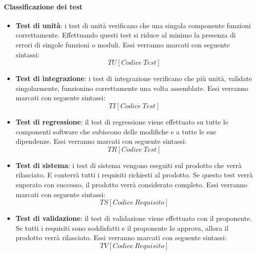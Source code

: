 \documentclass[../NormeDiProgetto_v4.0.0.tex]{subfiles}
\begin{document}
		\paragraph{Classificazione dei test}
			\begin{itemize}
			\item \textbf{Test di unità}:
			i test di unità verificano che una singola componente funzioni correttamente. Effettuando questi test si riduce al minimo la presenza di errori di singole funzioni o moduli. Essi verranno marcati con seguente sintassi:\\
			\begin{equation*}
				TU[Codice \ Test]
			\end{equation*}
			\item \textbf{Test di integrazione}:
			i test di integrazione verificano che più unità, validate singolarmente, funzionino correttamente una volta assemblate. Essi verranno marcati con seguente sintassi:\\
			\begin{equation*}
			TI[Codice \ Test]
			\end{equation*}
			\item \textbf{Test di regressione}:
			il test di regressione viene effettuato su tutte le componenti software che subiscono delle modifiche e a tutte le sue dipendenze.
			Essi verranno marcati con seguente sintassi:\\
			\begin{equation*}
			TR[Codice \ Test]
			\end{equation*}
			\item \textbf{Test di sistema}:
			i test di sistema vengono eseguiti sul prodotto che verrà rilasciato. E conterrà tutti i requisiti richiesti al prodotto. Se questo test verrà superato con successo, il prodotto verrà considerato completo.
			Essi verranno marcati con seguente sintassi:\\
			\begin{equation*}
			TS[Codice \ Requisito]
			\end{equation*}
			\item \textbf{Test di validazione}:
			il test di validazione viene effettuato con il proponente. Se tutti i requisiti sono soddisfatti e il proponente lo approva, allora il prodotto verrà rilasciato.
			Essi verranno marcati con seguente sintassi:\\
			\begin{equation*}
			TV[Codice \ Requisito]
			\end{equation*}
			\end{itemize}
\end{document}
